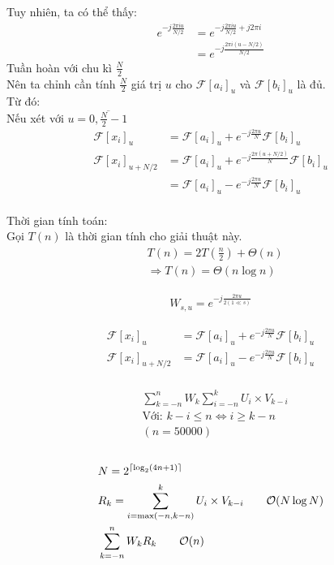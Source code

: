 \documentclass[12pt]{report}
\DeclarePairedDelimiter{\ceil}{\lceil}{\rceil}
\begin{document}
\newpage
\noindent Tuy nhiên, ta có thể thấy:
\begin{align*}
    e^{-j\frac{2\pi i u}{N/2}} 
    &= e^{-j\frac{2\pi i u}{N/2} + j 2\pi i}  \\
    &= e^{-j\frac{2\pi i (u - N/2)}{N/2}}
\end{align*}
Tuần hoàn với chu kì $\frac{N}{2}$ \\
Nên ta chỉnh cần tính $\frac{N}{2}$ giá trị $u$ cho 
$\mathcal{F}[a_i]_u$ và $\mathcal{F}[b_i]_u$ là đủ. \\[1cm]

\noindent Từ đó: \\
Nếu xét với $u = \overline{0, \frac{N}{2} - 1}$
\begin{align*}
    \mathcal{F}[x_i]_u &= \mathcal{F}[a_i]_u 
    + e^{-j\frac{2\pi u}{N}} \mathcal{F}[b_i]_u \\
    \mathcal{F}[x_i]_{u + N/2} &= \mathcal{F}[a_i]_u 
    + e^{-j\frac{2\pi (u + N/2)}{N}} \mathcal{F}[b_i]_u \\
    &= \mathcal{F}[a_i]_u 
    - e^{-j\frac{2\pi u}{N}} \mathcal{F}[b_i]_u
\end{align*}\\[1cm]

\noindent Thời gian tính toán:  \\
Gọi $T(n)$ là thời gian tính cho giải thuật này.
\begin{align*}
    &T\left(n\right) = 2 T\left(\frac{n}{2}\right) 
    + \Theta \left(n\right) \\
    &\Rightarrow T(n) = \Theta \left( n \log n\right)
\end{align*}

\begin{align*}
    W_{s, u} = e^{-j\frac{2\pi u}{2 (1 \ll s)}}
\end{align*}

\begin{align*}
    \mathcal{F}[x_i]_u &= \mathcal{F}[a_i]_u 
    + e^{-j\frac{2\pi u}{N}} \mathcal{F}[b_i]_u \\
    \mathcal{F}[x_i]_{u + N/2} &= \mathcal{F}[a_i]_u 
    - e^{-j\frac{2\pi u}{N}} \mathcal{F}[b_i]_u
\end{align*}\\[1cm]

\begin{align*}
    &\sum_{k = -n}^{n} W_k \sum_{i = -n}^k U_i \times V_{k - i} \\
    &\textrm{Với: } k - i \le n \Leftrightarrow i \ge k - n \\
    &(n = 50000)
\end{align*}\\[1cm]

\begin{align*}
    &N = 2^{\ceil{\log_2 (4n + 1)}} \\
    &R_k = \sum_{i = \max(-n, k - n) }^k U_i \times V_{k - i}
    \quad \quad \mathcal{O} (N \log N)\\
    &\sum_{k = -n}^n W_k R_k \quad\quad \mathcal{O}(n) 
\end{align*}\\[1cm]
\end{document}
